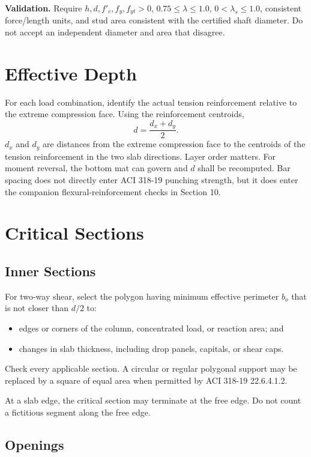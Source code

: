 \documentclass[10pt]{article}
\begin{document}
\textbf{Validation.} Require $h,d,f'_c,f_y,f_{yt}>0$,
$0.75\leq\lambda\leq1.0$, $0<\lambda_s\leq1.0$, consistent force/length units,
and stud area consistent with the certified shaft diameter. Do not accept an
independent diameter and area that disagree.

\section{Effective Depth}

For each load combination, identify the actual tension reinforcement relative
to the extreme compression face. Using the reinforcement centroids,
\begin{equation}
d=\frac{d_x+d_y}{2}.
\end{equation}
$d_x$ and $d_y$ are distances from the extreme compression face to the
centroids of the tension reinforcement in the two slab directions. Layer order
matters. For moment reversal, the bottom mat can govern and $d$ shall be
recomputed. Bar spacing does not directly enter ACI 318-19 punching strength,
but it does enter the companion flexural-reinforcement checks in Section 10.

\section{Critical Sections}

\subsection{Inner Sections}

For two-way shear, select the polygon having minimum effective perimeter $b_o$
that is not closer than $d/2$ to:
\begin{itemize}
\setlength\itemsep{0pt}
\item edges or corners of the column, concentrated load, or reaction area; and
\item changes in slab thickness, including drop panels, capitals, or shear caps.
\end{itemize}
Check every applicable section. A circular or regular polygonal support may be
replaced by a square of equal area when permitted by ACI 318-19 22.6.4.1.2.

At a slab edge, the critical section may terminate at the free edge. Do not
count a fictitious segment along the free edge.

\subsection{Openings}
\end{document}
